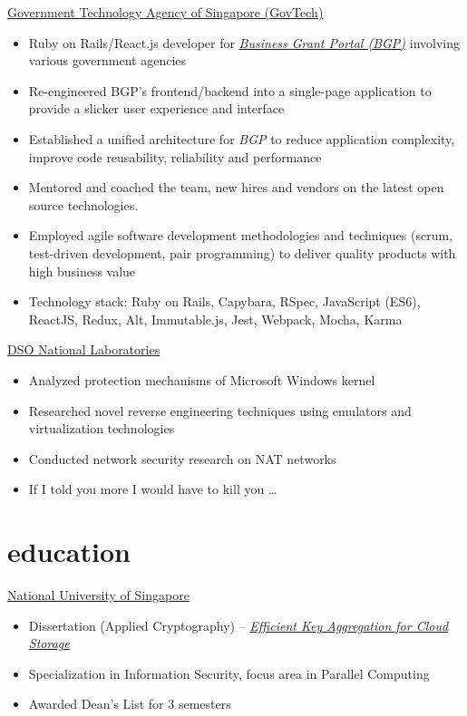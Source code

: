 \documentclass[]{cv} %
\begin{document}
\entry
{\href{https://www.tech.gov.sg/}{Government Technology Agency of Singapore (GovTech)}}
{
\begin{itemize}
\item Ruby on Rails/React.js developer for \href{https://www.businessgrants.gov.sg/}{\emph{Business Grant Portal (BGP)}} involving various government agencies
\item Re-engineered BGP's frontend/backend into a single-page application to provide a slicker user experience and interface
\item Established a unified architecture for \emph{BGP} to reduce application complexity, improve code reusability, reliability and performance
\item Mentored and coached the team, new hires and vendors on the latest open source technologies.
\item Employed agile software development methodologies and techniques (scrum, test-driven development, pair programming) to deliver quality products with high business value
\item Technology stack: Ruby on Rails, Capybara, RSpec, JavaScript (ES6), ReactJS, Redux, Alt, Immutable.js, Jest, Webpack, Mocha, Karma
\end{itemize}
}

\entry
{\href{https://www.dso.org.sg/}{DSO National Laboratories}}
{
\begin{itemize}
\item Analyzed protection mechanisms of Microsoft Windows kernel
\item Researched novel reverse engineering techniques using emulators and virtualization technologies
\item Conducted network security research on NAT networks
\item If I told you more I would have to kill you \dots
\end{itemize}
}


\section{education}
\entry
{\href{http://www.nus.edu.sg/}{National University of Singapore}}
{
\begin{itemize}
    \item Dissertation (Applied Cryptography) -- \href{https://github.com/clouddra/FYP---Key-Aggregation/blob/master/paper/paper.pdf}{\emph{Efficient Key Aggregation for Cloud Storage}}
    \item Specialization in Information Security, focus area in Parallel Computing
    \item Awarded Dean's List for 3 semesters
\end{itemize}
}
\end{document}
